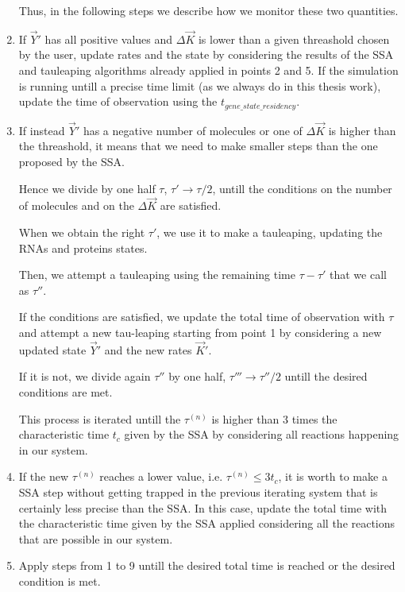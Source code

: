 \documentclass[12pt,a4paper]{report}
\begin{document}
\begin{enumerate}
Thus, in the following steps we describe how we monitor these two quantities.

\item If $\Vec{Y}'$ has all positive values and $\Delta \Vec{K}$ is lower than a given threashold chosen by the user, update rates and the state by considering the results of the SSA and tauleaping algorithms already applied in points 2 and 5. If the simulation is running untill a precise time limit (as we always do in this thesis work), update the time of observation using the $t_{gene\_state\_residency}$. 

\item If instead $\Vec{Y}'$ has a negative number of molecules or one of $\Delta \Vec{K}$ is higher than the threashold, it means that we need to make smaller steps than the one proposed by the SSA.

Hence we divide by one half $\tau$, $\tau' \rightarrow \tau/2$, untill the conditions on the number of molecules and on the $\Delta \Vec{K}$ are satisfied.

When we obtain the right $\tau'$, we use it to make a tauleaping, updating the RNAs and proteins states.

Then, we attempt a tauleaping using the remaining time $\tau - \tau'$ that we call as $\tau''$.

If the conditions are satisfied, we update the total time of observation with $\tau$ and attempt a new tau-leaping starting from point 1 by considering a new updated state $\Vec{Y}'$ and the new rates $\Vec{K}'$.

If it is not, we divide again $\tau''$ by one half, $\tau''' \rightarrow \tau''/2$ untill the desired conditions are met.

This process is iterated untill the $\tau^{(n)}$ is higher than 3 times the characteristic time $t_{c}$ given by the SSA by considering all reactions happening in our system.

\item If the new $\tau^{(n)}$ reaches a lower value, i.e. $\tau^{(n)} \leq 3t_{c}$, it is worth to make a SSA step without getting trapped in the previous iterating system that is certainly less precise than the SSA. In this case, update the total time with the characteristic time given by the SSA applied considering all the reactions that are possible in our system.

\item Apply steps from 1 to 9 untill the desired total time is reached or the desired condition is met.
\end{enumerate}
\end{document}
